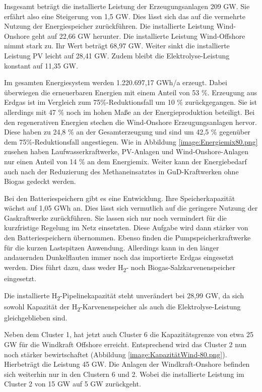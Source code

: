Insgesamt beträgt die installierte Leistung der Erzeugungsanlagen 209 GW. Sie erfährt also eine Steigerung von 1,5 GW. Dies lässt sich das auf die vermehrte Nutzung der Energiespeicher zurückführen. Die installierte Leistung Wind-Onshore geht auf 22,66 GW herunter. Die installierte Leistung Wind-Offshore nimmt stark zu. Ihr Wert beträgt 68,97 GW. Weiter sinkt die installierte Leistung PV leicht auf 28,41 GW. Zudem bleibt die Elektrolyse-Leistung konstant auf 11,35 GW. 


Im gesamten Energiesystem werden 1.220.697,17 GWh/a erzeugt. Dabei überwiegen die erneuerbaren Energien mit einem Anteil von 53 \%. Erzeugung aus Erdgas ist im Vergleich zum 75\%-Reduktionsfall um 10 \% zurückgegangen. Sie ist allerdings mit 47 \% noch im hohen Maße an der Energieproduktion beteiligt. Bei den regenerativen Energien stechen die Wind-Onshore Erzeugungsanlagen hervor. Diese haben zu 24,8 \% an der Gesamterzeugung und sind um 42,5 \% gegenüber dem 75\%-Reduktionsfall angestiegen. Wie in Abbildung \ref{image:Energiemix80.png} zusehen haben Laufwasserkraftwerke, PV-Anlagen und Wind-Onshore-Anlagen nur einen Anteil von 14 \% an dem Energiemix. Weiter kann der Energiebedarf auch nach der Reduzierung des Methaneinsatztes in GuD-Kraftwerken ohne Biogas gedeckt werden. 


Bei den Batteriespeichern gibt es eine Entwicklung. Ihre Speicherkapazität wächst auf 1,05 GWh an. Dies lässt sich vermutlich auf die geringere Nutzung der Gaskraftwerke zurückführen. Sie lassen sich nur noch vermindert für die kurzfristige Regelung im Netz einsetzten. Diese Aufgabe wird dann stärker von den Batteriespeichern übernommen. Ebenso finden die Pumpspeicherkraftwerke für die kurzen Lastspitzen Anwendung. Allerdings kann in den länger andauernden Dunkelflauten immer noch das importierte Erdgas eingesetzt werden. Dies führt dazu, dass weder H\textsubscript{2}- noch Biogas-Salzkarvenenspeicher eingesetzt.

Die installierte H\textsubscript{2}-Pipelinekapazität steht unverändert bei 28,99 GW, da sich sowohl Kapazität der H\textsubscript{2}-Karvenenspeicher als auch die Elektrolyse-Leistung gleichgeblieben sind.


Neben dem Cluster 1, hat jetzt auch Cluster 6 die Kapazitätsgrenze von etwa 25 GW für die Windkraft Offshore erreicht. Entsprechend wird das Cluster 2 nun noch stärker bewirtschaftet (Abbildung \ref{image:KapazitätWind-80.png}). Hierbeträgt die Leistung 45 GW. Die Anlagen der Windkraft-Onshore befinden sich weiterhin nur in den Clustern 6 und 2. Wobei die installierte Leistung im Cluster 2 von 15 GW auf 5 GW zurückgeht. 

